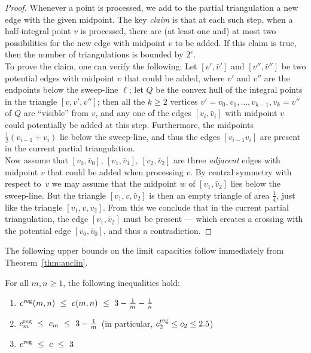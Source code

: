 \begin{proof}
Whenever a point is processed, we add to the partial
triangulation a new edge with the given midpoint.
The key \emph{claim} is that at each such step,
when a half-integral point $v$ is processed, 
there are (at least one and) at most two possibilities
for the new edge with midpoint $v$ to be added.
If this claim is true, then the number of triangulations
is bounded by $2^e$.
\[
\qquad
\]
To prove the claim, one can verify the following:
Let $[v',\bar v']$ and $[v'',\bar v'']$
be two potential edges with midpoint $v$ that could be added,
where $v'$ and $v''$ are the endpoints below the sweep-line $\ell$;
let $Q$ be the convex hull of the integral points in
the triangle $[v,v',v'']$; then all the $k\ge2$
vertices $v'=v_0,v_1,\dots,v_{k-1},v_k=v''$
of $Q$ are ``visible'' from $v$, and any one of the edges $[v_i,\bar v_i]$
with midpoint $v$ could potentially be added at this step.
Furthermore, the midpoints $\frac12(v_{i-1}+v_i)$ lie below
the sweep-line, and thus the edges $[v_{i-1}v_i]$
are present in the current partial triangulation.
\[

\]
Now assume that $[v_0,\bar v_0]$, $[v_1,\bar v_1]$, $[v_2,\bar v_2]$
are three \emph{adjacent} edges with midpoint $v$ that could be added when
processing $v$. By central symmetry with respect to~$v$
we may assume that the midpoint $w$
of $[v_1,\bar v_2]$ lies below the sweep-line. But the
triangle $[v_1,v,\bar v_2]$ is then an empty triangle of area
$\frac14$, just like the triangle $[v_1,v,v_2]$. From this
we conclude that in the current partial triangulation, 
the edge $[v_1,\bar v_2]$ must be present --- which creates
a crossing with the potential edge $[v_0,\bar v_0]$, and thus 
a contradiction.
\end{proof}

The following upper bounds on the limit capacities follow immediately
from Theorem~\ref{thm:anclin}.

\begin{cor}
For all $m,n\ge 1$, the following inequalities hold:
\begin{enumerate}
  \item[\rm (i) ] $\creg(m,n)\ \le\ c(m,n)\ \le\ 3-\frac1m -\frac1n$
  \item[\rm (ii) ] $\creg_m\ \le\ c_m\ \le\ 3-\frac1m$ \quad 
      {\rm  (in particular, $c^{\mathrm{reg}}_2\le c_2\le 2.5$)}
  \item[\rm (iii) ] $c^{\mathrm{reg}}\ \le\ c\ \le\ 3$
\end{enumerate}
\end{cor}

